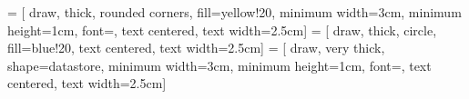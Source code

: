\makeatletter
{}
\makeatother


 = [
    draw,
    thick,
    rounded corners,
    fill=yellow!20,
    minimum width=3cm, 
    minimum height=1cm,
    font=\small,
    text centered, 
    text width=2.5cm]
 = [
    draw,
    thick,
    circle,
    fill=blue!20,
    text centered, 
    text width=2.5cm]
 = [
    draw,
    very thick,
    shape=datastore,
    minimum width=3cm, 
    minimum height=1cm,
    font=\small,
    text centered, 
    text width=2.5cm]

